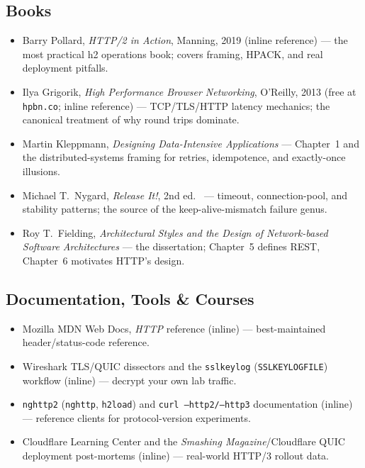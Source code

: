 \subsection*{Books}
\begin{itemize}
  \item Barry Pollard, \emph{HTTP/2 in Action}, Manning, 2019 (inline reference) --- the most practical h2 operations book; covers framing, HPACK, and real deployment pitfalls.
  \item Ilya Grigorik, \emph{High Performance Browser Networking}, O'Reilly, 2013 (free at \texttt{hpbn.co}; inline reference) --- TCP/TLS/HTTP latency mechanics; the canonical treatment of why round trips dominate.
  \item Martin Kleppmann, \emph{Designing Data-Intensive Applications} \cite{kleppmann2017ddia} --- Chapter~1 and the distributed-systems framing for retries, idempotence, and exactly-once illusions.
  \item Michael T.\ Nygard, \emph{Release It!}, 2nd ed.\ \cite{nygard2018releaseit} --- timeout, connection-pool, and stability patterns; the source of the keep-alive-mismatch failure genus.
  \item Roy T.\ Fielding, \emph{Architectural Styles and the Design of Network-based Software Architectures} \cite{fielding2000rest} --- the dissertation; Chapter~5 defines REST, Chapter~6 motivates HTTP's design.
\end{itemize}

\subsection*{Documentation, Tools \& Courses}
\begin{itemize}
  \item Mozilla MDN Web Docs, \emph{HTTP} reference (inline) --- best-maintained header/status-code reference.
  \item Wireshark TLS/QUIC dissectors and the \texttt{sslkeylog} (\texttt{SSLKEYLOGFILE}) workflow (inline) --- decrypt your own lab traffic.
  \item \texttt{nghttp2} (\texttt{nghttp}, \texttt{h2load}) and \texttt{curl --http2/--http3} documentation (inline) --- reference clients for protocol-version experiments.
  \item Cloudflare Learning Center and the \emph{Smashing Magazine}/Cloudflare QUIC deployment post-mortems (inline) --- real-world HTTP/3 rollout data.
\end{itemize}

